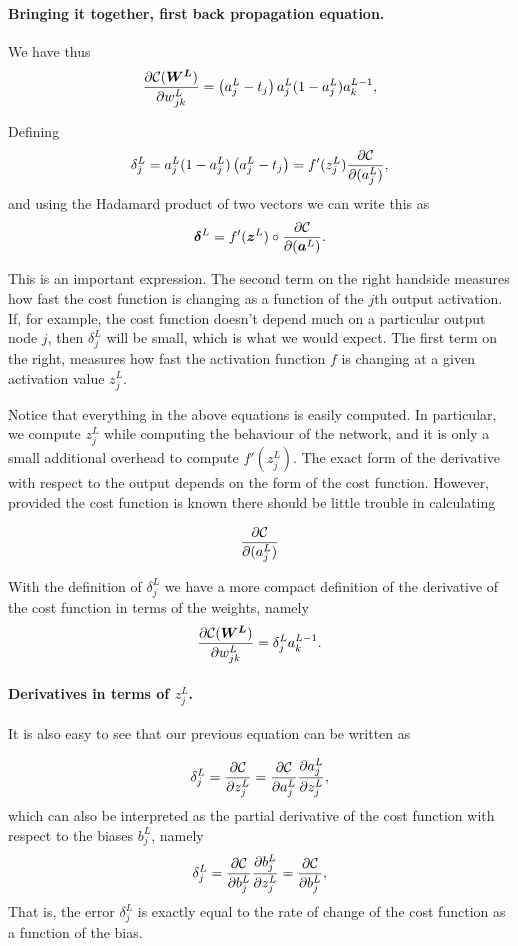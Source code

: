\documentclass[%
oneside,                 %
final,                   %
10pt]{article}
\begin{document}
\paragraph{Bringing it together, first back propagation equation.}
We have thus
\[
\frac{\partial{\cal C}(\boldsymbol{W^L})}{\partial w_{jk}^L}  =  \left(a_j^L - t_j\right)a_j^L(1-a_j^L)a_k^{L-1}, 
\]

Defining
\[
\delta_j^L = a_j^L(1-a_j^L)\left(a_j^L - t_j\right) = f'(z_j^L)\frac{\partial {\cal C}}{\partial (a_j^L)},
\]
and using the Hadamard product of two vectors we can write this as
\[
\boldsymbol{\delta}^L = f'(\boldsymbol{z}^L)\circ\frac{\partial {\cal C}}{\partial (\boldsymbol{a}^L)}.
\]

This is an important expression. The second term on the right handside
measures how fast the cost function is changing as a function of the $j$th
output activation.  If, for example, the cost function doesn't depend
much on a particular output node $j$, then $\delta_j^L$ will be small,
which is what we would expect. The first term on the right, measures
how fast the activation function $f$ is changing at a given activation
value $z_j^L$.

Notice that everything in the above equations is easily computed.  In
particular, we compute $z_j^L$ while computing the behaviour of the
network, and it is only a small additional overhead to compute
$f'(z^L_j)$.  The exact form of the derivative with respect to the
output depends on the form of the cost function.
However, provided the cost function is known there should be little
trouble in calculating

\[
\frac{\partial {\cal C}}{\partial (a_j^L)}
\]

With the definition of $\delta_j^L$ we have a more compact definition of the derivative of the cost function in terms of the weights, namely
\[
\frac{\partial{\cal C}(\boldsymbol{W^L})}{\partial w_{jk}^L}  =  \delta_j^La_k^{L-1}.
\]

\paragraph{Derivatives in terms of $z_j^L$.}
It is also easy to see that our previous equation can be written as

\[
\delta_j^L =\frac{\partial {\cal C}}{\partial z_j^L}= \frac{\partial {\cal C}}{\partial a_j^L}\frac{\partial a_j^L}{\partial z_j^L},
\]
which can also be interpreted as the partial derivative of the cost function with respect to the biases $b_j^L$, namely
\[
\delta_j^L = \frac{\partial {\cal C}}{\partial b_j^L}\frac{\partial b_j^L}{\partial z_j^L}=\frac{\partial {\cal C}}{\partial b_j^L},
\]
That is, the error $\delta_j^L$ is exactly equal to the rate of change of the cost function as a function of the bias. 
\end{document}
